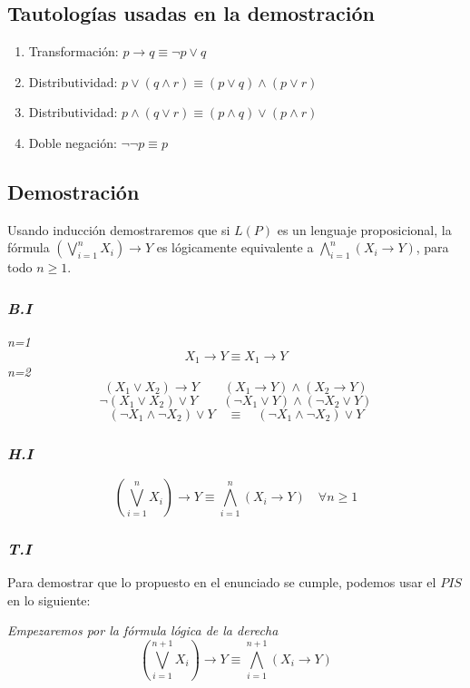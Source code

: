 \documentclass[../doc.tex]{subfiles}
\begin{document}
\subsection{Tautologías usadas en la demostración}
\begin{enumerate}
  \item Transformación:  $p \rightarrow q \equiv \neg p \lor q$
  \item Distributividad: $p \lor (q \land r) \equiv (p \lor q) \land (p \lor r)$
  \item Distributividad: $p \land (q \lor r) \equiv (p \land q) \lor (p \land r)$
  \item Doble negación: $\neg\neg p \equiv p$
\end{enumerate}

\subsection{Demostración}
Usando inducción demostraremos que si $L(P)$ es un lenguaje proposicional, la fórmula $(\bigvee _{i=1}^{n} X_i) \rightarrow Y $ es lógicamente equivalente a $\bigwedge _{i=1}^{n} (X_i \rightarrow Y)$,
para todo $n \ge 1$.
\subsubsection*{\emph{B.I}}
\emph{n=1}
\[X_1 \rightarrow Y \equiv X_1 \rightarrow Y\]
\emph{n=2}
\[(X_1 \lor X_2) \rightarrow Y \qquad (X_1 \rightarrow Y) \land (X_2 \rightarrow Y) \]
\[\neg(X_1 \lor X_2) \lor Y \qquad (\neg X_1 \lor Y) \land (\neg X_2 \lor Y) \]
\[(\neg X_1 \land \neg X_2) \lor Y \quad \equiv \quad (\neg X_1 \land \neg X_2) \lor Y \]

\subsubsection*{\emph{H.I}}
\[ (\bigvee _{i=1}^{n} X_i) \rightarrow Y \equiv \bigwedge _{i=1}^{n} (X_i \rightarrow Y) \quad \forall n \ge 1\]

\subsubsection*{\emph{T.I}}
Para demostrar que lo propuesto en el enunciado se cumple, podemos usar el $PIS$ en lo siguiente:


\emph{Empezaremos por la fórmula lógica de la derecha}
\[ (\bigvee _{i=1}^{n+1} X_i) \rightarrow Y \equiv \bigwedge _{i=1}^{n+1} (X_i \rightarrow Y) \]
\end{document}
